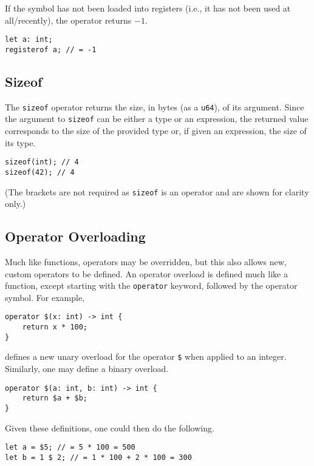 If the symbol has not been loaded into registers (i.e., it has not been used at all/recently), the operator returns \(-1\).

\begin{lstlisting}[language=CustomLang]
let a: int;
registerof a; // = -1
\end{lstlisting}

\subsection{Sizeof}

The \texttt{sizeof} operator returns the size, in bytes (as a \texttt{u64}), of its argument.
Since the argument to \texttt{sizeof} can be either a type or an expression, the returned value corresponds to the size of the provided type or, if given an expression, the size of its type.

\begin{lstlisting}[language=CustomLang]
sizeof(int); // 4
sizeof(42); // 4
\end{lstlisting}

(The brackets are not required as \texttt{sizeof} is an operator and are shown for clarity only.)

\subsection{Operator Overloading}

Much like functions, operators may be overridden, but this also allows new, custom operators to be defined.
An operator overload is defined much like a function, except starting with the \texttt{operator} keyword, followed by the operator symbol.
For example,

\begin{lstlisting}[language=CustomLang]
operator $(x: int) -> int {
    return x * 100;
}
\end{lstlisting}

defines a new unary overload for the operator \texttt{\$} when applied to an integer.
Similarly, one may define a binary overload.

\begin{lstlisting}[language=CustomLang]
operator $(a: int, b: int) -> int {
    return $a + $b;
}
\end{lstlisting}

Given these definitions, one could then do the following.

\begin{lstlisting}[language=CustomLang]
let a = $5; // = 5 * 100 = 500
let b = 1 $ 2; // = 1 * 100 + 2 * 100 = 300
\end{lstlisting}

